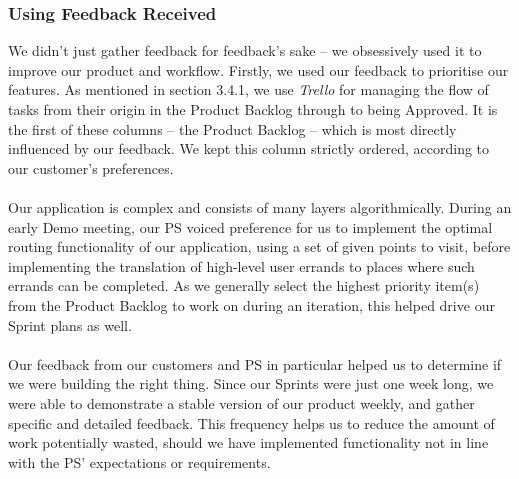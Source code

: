 \documentclass[a4paper, 10pt]{report}
\begin{document}
\subsubsection{Using Feedback Received}
We didn't just gather feedback for feedback's sake -- we obsessively used it to improve our product and workflow. Firstly, we used our feedback to prioritise our features. As mentioned in section 3.4.1, we use \textit{Trello} \cite{trello} for managing the flow of tasks from their origin in the Product Backlog through to being Approved. It is the first of these columns -- the Product Backlog -- which is most directly influenced by our feedback. We kept this column strictly ordered, according to our customer's preferences. \\\\
Our application is complex and consists of many layers algorithmically. During an early Demo meeting, our PS voiced preference for us to implement the optimal routing functionality of our application, using a set of given points to visit, before implementing the translation of high-level user errands to places where such errands can be completed. As we generally select the highest priority item(s) from the Product Backlog to work on during an iteration, this helped drive our Sprint plans as well.
\\\\
Our feedback from our customers and PS in particular helped us to determine if we were building the right thing. Since our Sprints were just one week long, we were able to demonstrate a stable version of our product weekly, and gather specific and detailed feedback. This frequency helps us to reduce the amount of work potentially wasted, should we have implemented functionality not in line with the PS' expectations or requirements.
\end{document}
